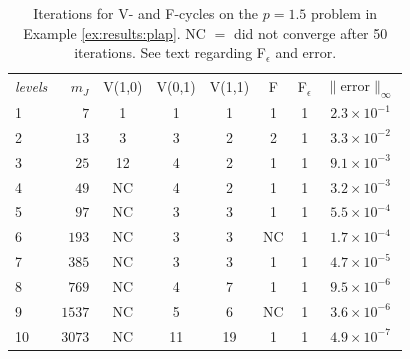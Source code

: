 \documentclass[letterpaper,final,12pt,reqno]{amsart}
\theoremstyle{cstyle}
\theoremstyle{cstyle*}
\theoremstyle{dstyle}
\numberwithin{equation}{section}
\numberwithin{figure}{section}
\numberwithin{table}{section}
\numberwithin{theorem}{section}
\newcommand{\eps}{\epsilon}
\begin{document}
\begin{table}[ht]
\begin{tabular}{lr@{\hskip 7mm}c@{\hskip 3mm}c@{\hskip 3mm}c@{\hskip 4mm}c@{\hskip 5mm}c@{\hskip 6mm}c}
\emph{levels} & $m_J$ & V(1,0) & V(0,1) & V(1,1) & F & F$_\eps$ & $\|$error$\|_\infty$ \\ \cmidrule{1-8}
 1 &    $7$ &  1 &  1 &  1 &  1 &  1 & $2.3\times 10^{-1}$ \\
 2 &   $13$ &  3 &  3 &  2 &  2 &  1 & $3.3 \times 10^{-2}$ \\
 3 &   $25$ & 12 &  4 &  2 &  1 &  1 & $9.1 \times 10^{-3}$ \\
 4 &   $49$ & NC &  4 &  2 &  1 &  1 & $3.2 \times 10^{-3}$ \\
 5 &   $97$ & NC &  3 &  3 &  1 &  1 & $5.5 \times 10^{-4}$ \\
 6 &  $193$ & NC &  3 &  3 & NC &  1 & $1.7 \times 10^{-4}$ \\
 7 &  $385$ & NC &  3 &  3 &  1 &  1 & $4.7 \times 10^{-5}$ \\
 8 &  $769$ & NC &  4 &  7 &  1 &  1 & $9.5 \times 10^{-6}$ \\
 9 & $1537$ & NC &  5 &  6 & NC &  1 & $3.6 \times 10^{-6}$ \\
10 & $3073$ & NC & 11 & 19 &  1 &  1 & $4.9 \times 10^{-7}$
\end{tabular}
\bigskip
\caption{Iterations for V- and F-cycles on the $p=1.5$ problem in Example \ref{ex:results:plap}.  NC $=$ did not converge after 50 iterations.  See text regarding F$_\eps$ and error.}
\label{tab:results:fastplap1d}
\end{table}
\end{document}
